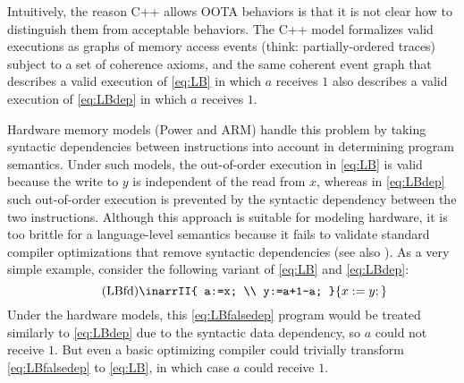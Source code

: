 Intuitively, the reason C++ allows OOTA behaviors is that it is not
clear how to distinguish them from acceptable behaviors.  The C++
model formalizes valid executions as graphs of memory access events
(think: partially-ordered traces) subject to a set of coherence
axioms, and the same coherent event graph that describes a valid
execution of \ref{eq:LB} in which $a$ receives $1$ also describes a valid
execution of \ref{eq:LBdep} in which $a$ receives $1$.


Hardware memory models (\eg Power and ARM) handle this problem by
taking syntactic dependencies between instructions into account in
determining program semantics.  Under such models, the out-of-order
execution in \ref{eq:LB} is valid because the write to $y$ is independent of
the read from $x$, whereas in \ref{eq:LBdep} such out-of-order execution is
prevented by the syntactic dependency between the two instructions.
Although this approach is suitable for modeling hardware, it is too
brittle for a language-level semantics because it fails to validate
standard compiler optimizations that remove syntactic dependencies (see also \cite{Boehm2014}).
As a very simple example, consider the following variant of \ref{eq:LB} and
\ref{eq:LBdep}:
\begin{equation}\label{eq:LBfalsedep}\tag{LBfd}
\inarrII{ a:=x; \\ y:=a+1-a; }{ x:=y; }
\end{equation}
Under the hardware models, this \ref{eq:LBfalsedep} program would be treated
similarly to \ref{eq:LBdep} due to the syntactic data dependency, so $a$ could
not receive $1$.  But even a basic optimizing compiler could trivially
transform \ref{eq:LBfalsedep} to \ref{eq:LB}, in which case $a$ could receive $1$.



